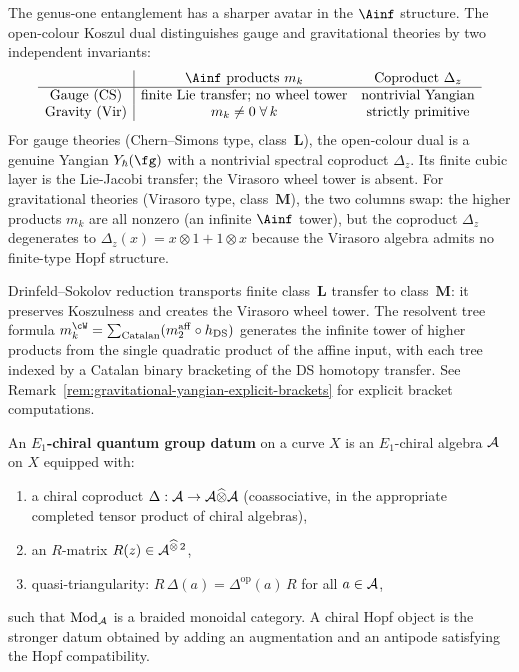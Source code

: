 \begin{remark}%
\label{rem:gauge-gravity-yangian-dichotomy}%
%
The genus-one entanglement has a sharper avatar in the $\Ainf$ structure. The open-colour Koszul dual distinguishes gauge and gravitational theories by two independent invariants:
\[
\begin{array}{c|cc}
& \Ainf\text{ products } m_k & \text{Coproduct } \Delta_z \\
\hline
\text{Gauge (CS)} & \text{finite Lie transfer; no wheel tower} &
 \text{nontrivial Yangian} \\
\text{Gravity (Vir)} & m_k \neq 0 \;\forall\, k &
 \text{strictly primitive}
\end{array}
\]
For gauge theories (Chern--Simons type, class~$\mathbf{L}$), the open-colour dual is a genuine Yangian $Y_\hbar(\fg)$ with a nontrivial spectral coproduct $\Delta_z$. Its finite cubic layer is the Lie-Jacobi transfer; the Virasoro wheel tower is absent. For gravitational theories (Virasoro type, class~$\mathbf{M}$), the two columns swap: the higher products $m_k$ are all nonzero (an infinite $\Ainf$ tower), but the coproduct $\Delta_z$ degenerates to $\Delta_z(x) = x \otimes 1 + 1 \otimes x$ because the Virasoro algebra admits no finite-type Hopf structure.

Drinfeld--Sokolov reduction transports finite class~$\mathbf{L}$ transfer to class~$\mathbf{M}$: it preserves Koszulness and creates the Virasoro wheel tower. The resolvent tree formula
$m_k^{\cW} = \sum_{\mathrm{Catalan}}(m_2^{\mathrm{aff}}
\circ h_{\mathrm{DS}})$
generates the infinite tower of higher products from the
single quadratic product of the affine input, with each tree
indexed by a Catalan binary bracketing of the DS homotopy transfer.
See Remark~\ref{rem:gravitational-yangian-explicit-brackets}
for explicit bracket computations.
\end{remark}

\begin{definition}%
\label{def:e1-chiral-quantum-group}%
%
%
An \textbf{$E_1$-chiral quantum group datum} on a curve $X$ is an
$E_1$-chiral algebra $\mathcal{A}$ on $X$ equipped with:
\begin{enumerate}
\item a chiral coproduct
 $\Delta : \mathcal{A} \to \mathcal{A} \widehat\otimes \mathcal{A}$
 (coassociative, in the appropriate completed tensor product
 of chiral algebras),
\item an $R$-matrix $R(z) \in \mathcal{A}^{\widehat\otimes\, 2}$,
\item quasi-triangularity:
 $R\,\Delta(a) = \Delta^{\mathrm{op}}(a)\,R$
 for all $a \in \mathcal{A}$,
\end{enumerate}
such that $\mathrm{Mod}_{\mathcal{A}}$ is a braided monoidal category.
A chiral Hopf object is the stronger datum obtained by adding an
augmentation and an antipode satisfying the Hopf compatibility.
\end{definition}

